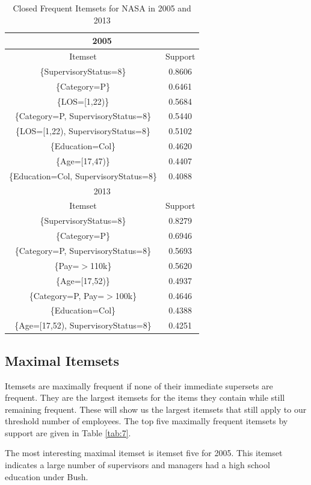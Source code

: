 \documentclass{article}
\begin{document}
    \begin{center}
        \begin{table}
            \centering
            \begin{tabular}{ |c|c| }
                \hline
                \multicolumn{2}{|c|}{2005} \\
                \hline
                Itemset & Support \\
                \hline
                \{SupervisoryStatus=8\} & 0.8606 \\
                \{Category=P\} & 0.6461 \\
                \{LOS=[1,22)\} & 0.5684 \\
                \{Category=P, SupervisoryStatus=8\} & 0.5440 \\
                \{LOS=[1,22), SupervisoryStatus=8\} & 0.5102 \\
                \{Education=Col\} & 0.4620 \\
                \{Age=[17,47)\} & 0.4407 \\
                \{Education=Col, SupervisoryStatus=8\} & 0.4088 \\
                \hline
                \multicolumn{2}{|c|}{2013} \\
                \hline
                Itemset & Support \\
                \hline
                \{SupervisoryStatus=8\} & 0.8279 \\
                \{Category=P\} & 0.6946 \\
                \{Category=P, SupervisoryStatus=8\} & 0.5693 \\
                \{Pay=$>$110k\} & 0.5620 \\
                \{Age=[17,52)\} & 0.4937 \\
                \{Category=P, Pay=$>$100k\} & 0.4646 \\
                \{Education=Col\} & 0.4388 \\
                \{Age=[17,52), SupervisoryStatus=8\} & 0.4251 \\
                \hline
            \end{tabular}
            \caption{Closed Frequent Itemsets for NASA in 2005 and 2013}
            \label{tab:6}
        \end{table}
    \end{center}

    \subsection{Maximal Itemsets}
    Itemsets are maximally frequent if none of their immediate supersets are frequent. They are the largest itemsets for the items they contain while still remaining frequent. These will show us the largest itemsets that still apply to our threshold number of employees. The top five maximally frequent itemsets by support are given in Table \ref{tab:7}.
    \par
    The most interesting maximal itemset is itemset five for 2005. This itemset indicates a large number of supervisors and managers had a high school education under Bush.
\end{document}
